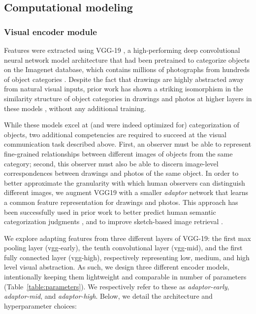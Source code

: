 \documentclass[9pt,twocolumn,twoside]{pnas-new}
\begin{document}
{%

\subsection*{Computational modeling}


\subsubsection*{Visual encoder module}

Features were extracted using VGG-19 \cite{simonyan2014very}, a high-performing deep convolutional neural network model architecture that had been pretrained to categorize objects on the Imagenet database, which contains millions of photographs from hundreds of object categories \cite{deng2009imagenet}. Despite the fact that drawings are highly abstracted away from natural visual inputs, prior work has shown a striking isomorphism in the similarity structure \cite{kriegeskorte2008matching} of object categories in drawings and photos at higher layers in these models \cite{fan2015common}, without any additional training.

While these models excel at (and were indeed optimized for) categorization of objects, two additional competencies are required to succeed at the visual communication task described above. First, an observer must be able to represent fine-grained relationships between different images of objects from the same category; second, this observer must also be able to discern image-level correspondences between drawings and photos of the same object. In order to better approximate the granularity with which human observers can distinguish different images, we augment VGG19 with a smaller \textit{adaptor} network that learns a common feature representation for drawings and photos. This approach has been successfully used in prior work to better predict human semantic categorization judgments \cite[]{peterson2016adapting}, and to improve sketch-based image retrieval \cite[]{sangkloy2016sketchy}.

We explore adapting features from three different layers of VGG-19: the first max pooling layer (vgg-early), the tenth convolutional layer (vgg-mid), and the first fully connected layer (vgg-high), respectively representing low, medium, and high level visual abstraction. As such, we design three different encoder models, intentionally keeping them lightweight and comparable in number of parameters (Table~\ref{table:parameters}). We respectively refer to these as \textit{adaptor-early}, \textit{adaptor-mid}, and \textit{adaptor-high}. Below, we detail the architecture and hyperparameter choices:

}
\end{document}
